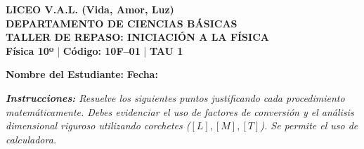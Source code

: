 \documentclass[12pt, letterpaper]{article}
\begin{document}
	
	\begin{center}
		{\Large \textbf{\color{valblue} LICEO V.A.L. (Vida, Amor, Luz)}}\\[0.1cm]
		{\large \textbf{DEPARTAMENTO DE CIENCIAS BÁSICAS}}\\[0.1cm]
		{\large \textbf{TALLER DE REPASO: INICIACIÓN A LA FÍSICA}}\\[0.1cm]
		{\small \textbf{Física 10º} \quad | \quad \textbf{Código: 10F--01} \quad | \quad \textbf{TAU 1}}
	\end{center}
	
	\vspace{0.2cm}
	\noindent \textbf{Nombre del Estudiante:} \underline{\hspace{8.5cm}} \hfill \textbf{Fecha:} \underline{\hspace{3cm}}
	\vspace{0.4cm}
	
	\begin{tcolorbox}[colback=valgray, colframe=valdark, arc=1mm, boxrule=0.8pt]
		\textit{\textbf{Instrucciones:} Resuelve los siguientes puntos justificando cada procedimiento matemáticamente. Debes evidenciar el uso de factores de conversión y el análisis dimensional riguroso utilizando corchetes ($[L], [M], [T]$). Se permite el uso de calculadora.}
	\end{tcolorbox}
	\vspace{0.4cm}
	
\end{document}
